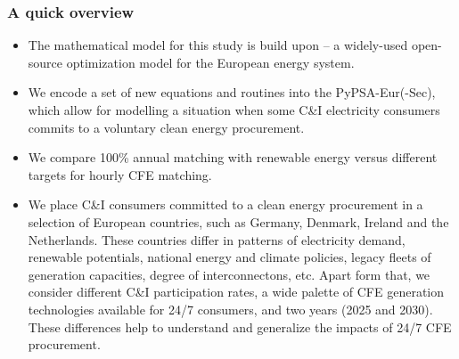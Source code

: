 \begin{frame}
  \frametitle{A quick overview}


{\small
  \begin{itemize}
    
    \item The mathematical model for this study is build upon 
     --
    a widely-used open-source optimization model for the European energy system.

    \item We encode a set of new equations and routines into the PyPSA-Eur(-Sec),
    which allow for modelling a situation when some C\&I electricity consumers 
    commits to a voluntary clean energy procurement.

    \item We compare 100\% annual matching with renewable energy versus 
    different targets for hourly CFE matching.

    \item We place C\&I consumers committed to a clean energy procurement in a 
    selection of European countries, such as Germany, Denmark, Ireland and the Netherlands.
    These countries differ in patterns of electricity demand, renewable potentials,
    national energy and climate policies, legacy fleets of generation capacities, degree 
    of interconnectons, etc. Apart form that, we consider different C\&I participation rates, a wide palette 
    of CFE generation technologies available for 24/7 consumers, 
    and two years (2025 and 2030). These differences help to understand and generalize 
    the impacts of 24/7 CFE procurement.
    
  \end{itemize}
}

\end{frame}


